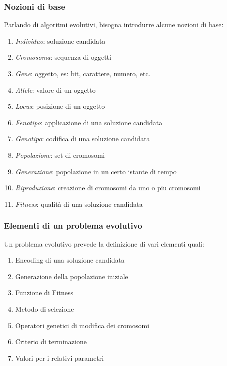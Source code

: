 \documentclass[a4paper]{article}
\begin{document}
\subsubsection{Nozioni di base}
Parlando di algoritmi evolutivi, bisogna introdurre alcune nozioni di base:
\begin{enumerate}
    \item \emph{Individuo}: soluzione candidata
    \item \emph{Cromosoma}: sequenza di oggetti
    \item \emph{Gene}: oggetto, es: bit, carattere, numero, etc.
    \item \emph{Allele}: valore di un oggetto
    \item \emph{Locus}: posizione di un oggetto
    \item \emph{Fenotipo}: applicazione di una soluzione candidata
    \item \emph{Genotipo}: codifica di una soluzione candidata
    \item \emph{Popolazione}: set di cromosomi
    \item \emph{Generazione}: popolazione in un certo istante di tempo
    \item \emph{Riproduzione}: creazione di cromosomi da uno o piu cromosomi
    \item \emph{Fitness}: qualità di una soluzione candidata
\end{enumerate}

\subsubsection{Elementi di un problema evolutivo}
Un problema evolutivo prevede la definizione di vari elementi quali:
\begin{enumerate}
    \item Encoding di una soluzione candidata
    \item Generazione della popolazione iniziale
    \item Funzione di Fitness
    \item Metodo di selezione
    \item Operatori genetici di modifica dei cromosomi
    \item Criterio di terminazione
    \item Valori per i relativi parametri
\end{enumerate}
\end{document}
